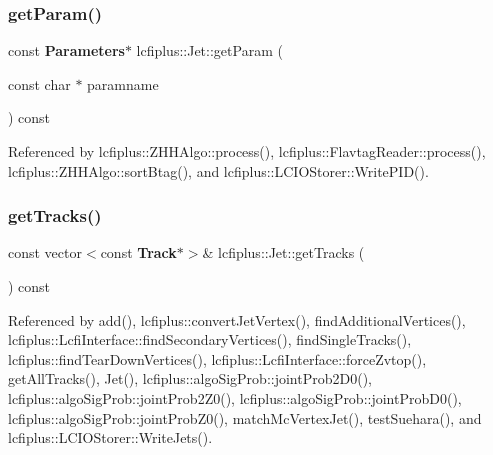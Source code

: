 \mbox{\label{classlcfiplus_1_1Jet_adadcdfc8e5cff04e39522f7b9cd6a5b4}} 
\subsubsection{get\+Param()}
{\footnotesize\ttfamily const \textbf{ Parameters}$\ast$ lcfiplus\+::\+Jet\+::get\+Param (\begin{DoxyParamCaption}\item[{const char $\ast$}]{paramname }\end{DoxyParamCaption}) const\hspace{0.3cm}{\ttfamily [inline]}}



Referenced by lcfiplus\+::\+Z\+H\+H\+Algo\+::process(), lcfiplus\+::\+Flavtag\+Reader\+::process(), lcfiplus\+::\+Z\+H\+H\+Algo\+::sort\+Btag(), and lcfiplus\+::\+L\+C\+I\+O\+Storer\+::\+Write\+P\+I\+D().

\mbox{\label{classlcfiplus_1_1Jet_a39dcfe454615cac01f2f65f6f840efd0}} 
\subsubsection{get\+Tracks()}
{\footnotesize\ttfamily const vector$<$const \textbf{ Track}$\ast$$>$\& lcfiplus\+::\+Jet\+::get\+Tracks (\begin{DoxyParamCaption}{ }\end{DoxyParamCaption}) const\hspace{0.3cm}{\ttfamily [inline]}}



Referenced by add(), lcfiplus\+::convert\+Jet\+Vertex(), find\+Additional\+Vertices(), lcfiplus\+::\+Lcfi\+Interface\+::find\+Secondary\+Vertices(), find\+Single\+Tracks(), lcfiplus\+::find\+Tear\+Down\+Vertices(), lcfiplus\+::\+Lcfi\+Interface\+::force\+Zvtop(), get\+All\+Tracks(), Jet(), lcfiplus\+::algo\+Sig\+Prob\+::joint\+Prob2\+D0(), lcfiplus\+::algo\+Sig\+Prob\+::joint\+Prob2\+Z0(), lcfiplus\+::algo\+Sig\+Prob\+::joint\+Prob\+D0(), lcfiplus\+::algo\+Sig\+Prob\+::joint\+Prob\+Z0(), match\+Mc\+Vertex\+Jet(), test\+Suehara(), and lcfiplus\+::\+L\+C\+I\+O\+Storer\+::\+Write\+Jets().

\mbox{\label{classlcfiplus_1_1Jet_a00494f266c25d6e2139f6243aa8abe68}} 
